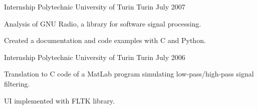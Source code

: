 \begin{cventries}
  \cventry
    {Internship} %
    {Polytechnic University of Turin} %
    {Turin} %
    {July 2007} %
    {
      \begin{cvitems} %
        \item {Analysis of GNU Radio, a library for software signal processing.}
        \item {Created a documentation and code examples with C and Python.}
      \end{cvitems}
    }

  \cventry
    {Internship} %
    {Polytechnic University of Turin} %
    {Turin} %
    {July 2006} %
    {
      \begin{cvitems} %
        \item {Translation to C code of a MatLab program simulating low-pass/high-pass signal filtering.}
        \item {UI implemented with FLTK library.}
      \end{cvitems}
    }

\end{cventries}
